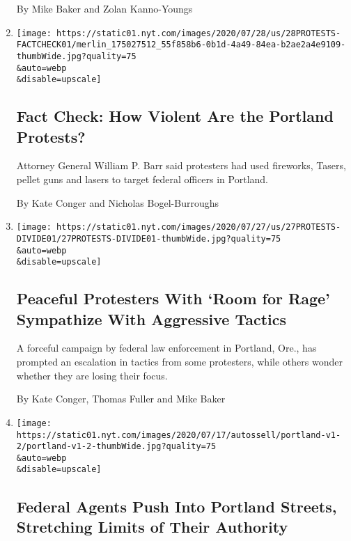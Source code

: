 \begin{enumerate}
  By Mike Baker and Zolan Kanno-Youngs
\item
  \href{/2020/07/28/us/portland-protests-fact-check.html}{}

  \texttt{[image: https://static01.nyt.com/images/2020/07/28/us/28PROTESTS-FACTCHECK01/merlin\_175027512\_55f858b6-0b1d-4a49-84ea-b2ae2a4e9109-thumbWide.jpg?quality=75\\\&auto=webp\\\&disable=upscale]}

  \hypertarget{fact-check-how-violent-are-the-portland-protests}{%
  \subsection{Fact Check: How Violent Are the Portland
  Protests?}\label{fact-check-how-violent-are-the-portland-protests}}

  Attorney General William P. Barr said protesters had used fireworks,
  Tasers, pellet guns and lasers to target federal officers in Portland.

  By Kate Conger and Nicholas Bogel-Burroughs
\item
  \href{/2020/07/27/us/protests-divisions-blm.html}{}

  \texttt{[image: https://static01.nyt.com/images/2020/07/27/us/27PROTESTS-DIVIDE01/27PROTESTS-DIVIDE01-thumbWide.jpg?quality=75\\\&auto=webp\\\&disable=upscale]}

  \hypertarget{peaceful-protesters-with-room-for-rage-sympathize-with-aggressive-tactics}{%
  \subsection{Peaceful Protesters With `Room for Rage' Sympathize With
  Aggressive
  Tactics}\label{peaceful-protesters-with-room-for-rage-sympathize-with-aggressive-tactics}}

  A forceful campaign by federal law enforcement in Portland, Ore., has
  prompted an escalation in tactics from some protesters, while others
  wonder whether they are losing their focus.

  By Kate Conger, Thomas Fuller and Mike Baker
\item
  \href{/2020/07/25/us/portland-federal-legal-jurisdiction-courts.html}{}

  \texttt{[image: https://static01.nyt.com/images/2020/07/17/autossell/portland-v1-2/portland-v1-2-thumbWide.jpg?quality=75\\\&auto=webp\\\&disable=upscale]}

  \hypertarget{federal-agents-push-into-portland-streets-stretching-limits-of-their-authority}{%
  \subsection{Federal Agents Push Into Portland Streets, Stretching
  Limits of Their
  Authority}\label{federal-agents-push-into-portland-streets-stretching-limits-of-their-authority}}


\end{enumerate}
